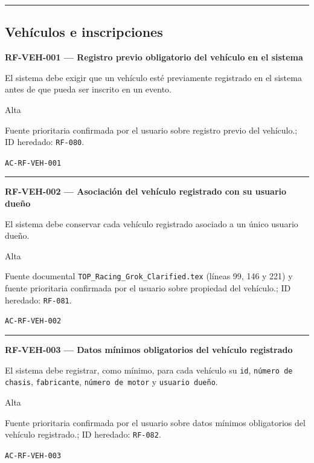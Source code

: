 \documentclass[10pt,letterpaper]{article}
\begin{document}
\vspace{0.25em}\hrule\vspace{0.65em}
\subsection{Vehículos e inscripciones}
\noindent\textbf{RF-VEH-001 --- Registro previo obligatorio del vehículo en el sistema}\par
\begin{description}[style=nextline,leftmargin=3.15cm,labelwidth=2.8cm,font=\normalfont\bfseries]
\item[Obligación] El sistema debe exigir que un vehículo esté previamente registrado en el sistema antes de que pueda ser inscrito en un evento.
\item[Prioridad] Alta
\item[Procedencia] Fuente prioritaria confirmada por el usuario sobre registro previo del vehículo.; ID heredado: \texttt{RF-080}.
\item[Verificación] \texttt{AC-RF-VEH-001}
\end{description}
\vspace{0.25em}\hrule\vspace{0.65em}
\noindent\textbf{RF-VEH-002 --- Asociación del vehículo registrado con su usuario dueño}\par
\begin{description}[style=nextline,leftmargin=3.15cm,labelwidth=2.8cm,font=\normalfont\bfseries]
\item[Obligación] El sistema debe conservar cada vehículo registrado asociado a un único usuario dueño.
\item[Prioridad] Alta
\item[Procedencia] Fuente documental \texttt{TOP\_Racing\_Grok\_Clarified.tex} (líneas 99, 146 y 221) y fuente prioritaria confirmada por el usuario sobre propiedad del vehículo.; ID heredado: \texttt{RF-081}.
\item[Verificación] \texttt{AC-RF-VEH-002}
\end{description}
\vspace{0.25em}\hrule\vspace{0.65em}
\noindent\textbf{RF-VEH-003 --- Datos mínimos obligatorios del vehículo registrado}\par
\begin{description}[style=nextline,leftmargin=3.15cm,labelwidth=2.8cm,font=\normalfont\bfseries]
\item[Obligación] El sistema debe registrar, como mínimo, para cada vehículo su \texttt{id}, \texttt{número de chasis}, \texttt{fabricante}, \texttt{número de motor} y \texttt{usuario dueño}.
\item[Prioridad] Alta
\item[Procedencia] Fuente prioritaria confirmada por el usuario sobre datos mínimos obligatorios del vehículo registrado.; ID heredado: \texttt{RF-082}.
\item[Verificación] \texttt{AC-RF-VEH-003}
\end{description}
\end{document}
